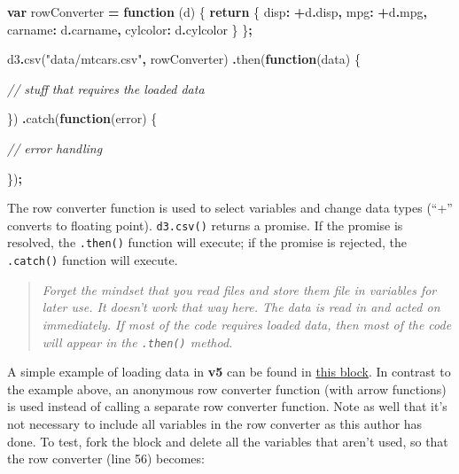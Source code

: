\documentclass[
  openany]{book}
\newenvironment{Shaded}{\begin{snugshade}}{\end{snugshade}}
\newcommand{\AttributeTok}[1]{\textcolor[rgb]{0.77,0.63,0.00}{#1}}
\newcommand{\CommentTok}[1]{\textcolor[rgb]{0.56,0.35,0.01}{\textit{#1}}}
\newcommand{\ControlFlowTok}[1]{\textcolor[rgb]{0.13,0.29,0.53}{\textbf{#1}}}
\newcommand{\DataTypeTok}[1]{\textcolor[rgb]{0.13,0.29,0.53}{#1}}
\newcommand{\FunctionTok}[1]{\textcolor[rgb]{0.00,0.00,0.00}{#1}}
\newcommand{\KeywordTok}[1]{\textcolor[rgb]{0.13,0.29,0.53}{\textbf{#1}}}
\newcommand{\NormalTok}[1]{#1}
\newcommand{\OperatorTok}[1]{\textcolor[rgb]{0.81,0.36,0.00}{\textbf{#1}}}
\newcommand{\StringTok}[1]{\textcolor[rgb]{0.31,0.60,0.02}{#1}}
\begin{document}
\begin{Shaded}
\begin{Highlighting}[]
\KeywordTok{var}\NormalTok{ rowConverter }\OperatorTok{=} \KeywordTok{function}\NormalTok{ (d) \{}
  \ControlFlowTok{return}\NormalTok{ \{}
    \DataTypeTok{disp}\OperatorTok{:} \OperatorTok{+}\NormalTok{d}\OperatorTok{.}\AttributeTok{disp}\OperatorTok{,}
    \DataTypeTok{mpg}\OperatorTok{:} \OperatorTok{+}\NormalTok{d}\OperatorTok{.}\AttributeTok{mpg}\OperatorTok{,}
    \DataTypeTok{carname}\OperatorTok{:}\NormalTok{ d}\OperatorTok{.}\AttributeTok{carname}\OperatorTok{,}
    \DataTypeTok{cylcolor}\OperatorTok{:}\NormalTok{ d}\OperatorTok{.}\AttributeTok{cylcolor}
\NormalTok{    \}}
\NormalTok{\}}\OperatorTok{;}  

\NormalTok{d3}\OperatorTok{.}\FunctionTok{csv}\NormalTok{(}\StringTok{"data/mtcars.csv"}\OperatorTok{,}\NormalTok{ rowConverter)}
  \OperatorTok{.}\FunctionTok{then}\NormalTok{(}\KeywordTok{function}\NormalTok{(data) \{}

\CommentTok{// stuff that requires the loaded data}

\NormalTok{  \})}
  \OperatorTok{.}\FunctionTok{catch}\NormalTok{(}\KeywordTok{function}\NormalTok{(error) \{}
  
\CommentTok{// error handling  }
  
\NormalTok{  \})}\OperatorTok{;}
\end{Highlighting}
\end{Shaded}

The row converter function is used to select variables and change data types (``+'' converts to floating point). \texttt{d3.csv()} returns a promise. If the promise is resolved, the \texttt{.then()} function will execute; if the promise is rejected, the \texttt{.catch()} function will execute.

\begin{quote}
\emph{Forget the mindset that you read files and store them file in variables for later use. It doesn't work that way here. The data is read in and acted on immediately. If most of the code requires loaded data, then most of the code will appear in the \texttt{.then()} method.}
\end{quote}

A simple example of loading data in \textbf{v5} can be found in \href{https://blockbuilder.org/tiktaktok/c2e02e2916c226ef44ed233cb46db40c}{this block}. In contrast to the example above, an anonymous row converter function (with arrow functions) is used instead of calling a separate row converter function. Note as well that it's not necessary to include all variables in the row converter as this author has done. To test, fork the block and delete all the variables that aren't used, so that the row converter (line 56) becomes:
\end{document}
